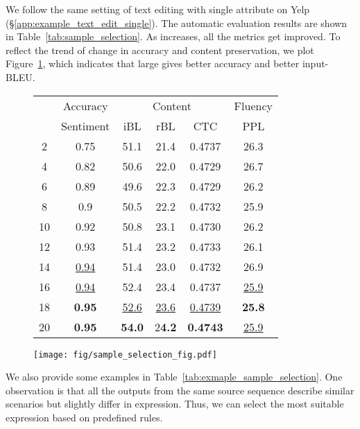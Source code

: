 \documentclass[11pt]{article}
\begin{document}
We follow the same setting of text editing with single attribute on Yelp (\S\ref{app:example_text_edit_single}). The automatic evaluation results are shown in Table~\ref{tab:sample_selection}. As  increases, all the metrics get improved. To reflect the trend of change in accuracy and content preservation, we plot Figure~\ref{fig:sample_selection}, which indicates that large  gives better accuracy and better input-BLEU.


\begin{figure}[ht]
\begin{minipage}[ht]{0.5\textwidth}
\centering
\small
\begin{tabular}{cccccc}
\toprule


\multirow{2}{*}{}&Accuracy&\multicolumn{3}{c}{Content}&Fluency\\\cmidrule(r){2-2}\cmidrule(r){3-5}\cmidrule(r){6-6}
& Sentiment & iBL & rBL & CTC & PPL\\\midrule
2&0.75&51.1&21.4&0.4737&26.3\\
4&0.82&50.6&22.0&0.4729&26.7\\
6&0.89&49.6&22.3&0.4729&26.2\\
8&0.9&50.5&22.2&0.4732&25.9\\
10&0.92&50.8&23.1&0.4730&26.2\\
12&0.93&51.4&23.2&0.4733&26.1\\
14&\underline{0.94}&51.4&23.0&0.4732&26.9\\
16&\underline{0.94}&52.4&23.4&0.4737&\underline{25.9}\\
18&\textbf{0.95}&\underline{52.6}&\underline{23.6}&\underline{0.4739}&\textbf{25.8}\\
20&\textbf{0.95}&\textbf{54.0}&2\textbf{4.2}&\textbf{0.4743}&\underline{25.9}\\
\bottomrule
\end{tabular}
  \label{tab:sample_selection}
\end{minipage}
\hfill
\begin{minipage}[ht]{0.48\textwidth}
\centering
\texttt{[image: fig/sample\_selection\_fig.pdf]}
\label{fig:sample_selection}
\end{minipage}
\end{figure}
We also provide some examples in Table~\ref{tab:exmaple_sample_selection}. One observation is that all the outputs from the same source sequence describe similar scenarios but slightly differ in expression.
Thus, we can select the most suitable expression based on predefined rules. 
\end{document}
